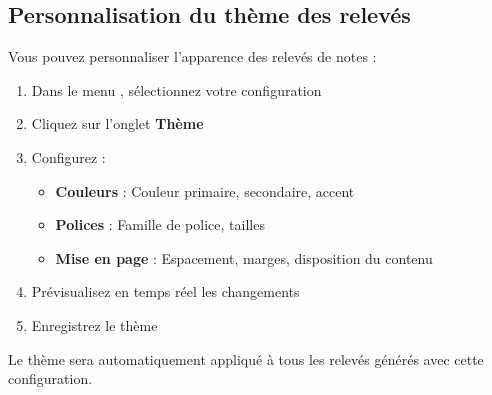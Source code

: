 \subsection{Personnalisation du thème des relevés}

Vous pouvez personnaliser l'apparence des relevés de notes :

\begin{enumerate}[leftmargin=*]
    \item Dans le menu , sélectionnez votre configuration
    \item Cliquez sur l'onglet \textbf{Thème}
    \item Configurez :
    \begin{itemize}
        \item \textbf{Couleurs} : Couleur primaire, secondaire, accent
        \item \textbf{Polices} : Famille de police, tailles
        \item \textbf{Mise en page} : Espacement, marges, disposition du contenu
    \end{itemize}
    \item Prévisualisez en temps réel les changements
    \item Enregistrez le thème
\end{enumerate}

Le thème sera automatiquement appliqué à tous les relevés générés avec cette configuration.

\newpage
